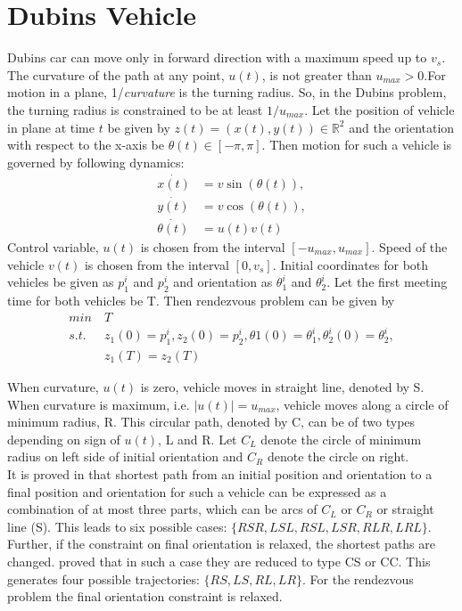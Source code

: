 \documentclass[11pt]{article} %
\begin{document}
\section{Dubins Vehicle}

Dubins car can move only in forward direction with a maximum speed up to $v_s$. The curvature of the
path at any point, $u(t)$, is not greater than $u_{max} > 0$.For motion in a plane, 1/\textit{curvature} is the turning radius. So, in the Dubins problem, the turning radius is constrained to be at least $1/u_{max}$. Let the position of vehicle in plane at time $t$ be given by $z(t) = (x(t), y(t)) \in \mathbb{R}^2$ and the orientation with respect to the x-axis be $\theta(t) \in [-\pi,\pi]$. Then motion for such a vehicle is governed by following dynamics:
\begin{equation}
\begin{aligned}
\dot{x(t)} &= v \sin(\theta(t)),\\
\dot{y(t)} &= v \cos(\theta(t)),\\
\dot{\theta(t)} &= u(t)v(t)
\end{aligned}
\end{equation}
Control variable, $u(t)$ is chosen from the interval $[-u_{max},u_{max}]$. Speed of the vehicle $v(t)$ is chosen from the interval $[0,v_s]$.
 Initial coordinates for both vehicles be given as $p^i_1$ and $p^i_2$ and orientation as $\theta^i_1$ and $\theta^i_2$. Let the first meeting time for both vehicles be T. Then rendezvous problem can be given by
 \begin{equation}
\begin{aligned}
min \: & T\\
s.t. \; & z_1(0) = p^i_1, z_2(0) = p^i_2, \theta1(0) = \theta^i_1, \theta^i_2(0) = \theta^i_2,\\
& z_1(T) = z_2(T)
\end{aligned}
\end{equation} 

 When curvature, $u(t)$ is zero, vehicle moves in straight line, denoted by S. When curvature is maximum, i.e. $|u(t)| = u_{max}$, vehicle moves along a circle of minimum radius, R. This circular path, denoted by C, can be of two types depending on sign of $u(t)$, L and R. Let $C_L$ denote the circle of minimum radius on left side of initial orientation and $C_R$ denote the circle on right.\\
 It is proved in \cite{dubin} that shortest path from an initial position and orientation to a final position and orientation for such a vehicle can be expressed as a combination of at most three parts, which can be arcs of $C_L$ or $C_R$ or straight line (S). This leads to six possible cases: $\{RSR, LSL, RSL, LSR, RLR, LRL\}$. Further, if the constraint on final orientation is relaxed, the shortest paths are changed.  \cite{cockayne} proved that in such a case they are reduced to type CS or CC. This generates four possible trajectories: $\{ RS, LS, RL, LR \}$. For the rendezvous problem the final orientation constraint is relaxed.
\end{document}

